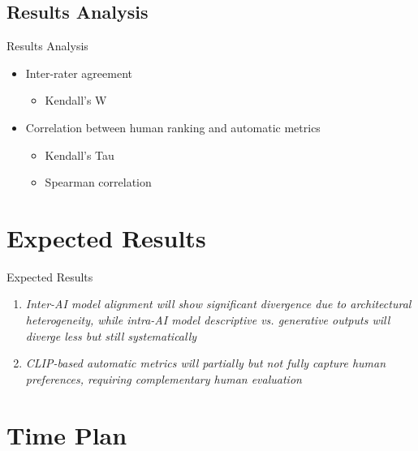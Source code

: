 \documentclass[aspectratio=169,xcolor=dvipsnames]{beamer}
\begin{document}
\subsection{Results Analysis}

\begin{frame}{Results Analysis}
    \begin{itemize}
        \item Inter-rater agreement
        \begin{itemize}
            \item Kendall's W
        \end{itemize}
        \item Correlation between human ranking and automatic metrics
        \begin{itemize}
            \item Kendall's Tau
            \item Spearman correlation 
        \end{itemize}
    \end{itemize}
\end{frame}

\section{Expected Results}

\begin{frame}{Expected Results}
    \begin{enumerate}
        \item \emph{Inter-AI model alignment will show significant divergence due to architectural heterogeneity, while
intra-AI model descriptive vs. generative outputs will diverge less but still systematically} 
        \item \emph{CLIP-based automatic metrics will partially but not fully capture human preferences, requiring
complementary human evaluation}
    \end{enumerate}
\end{frame}

\section{Time Plan}
\end{document}

